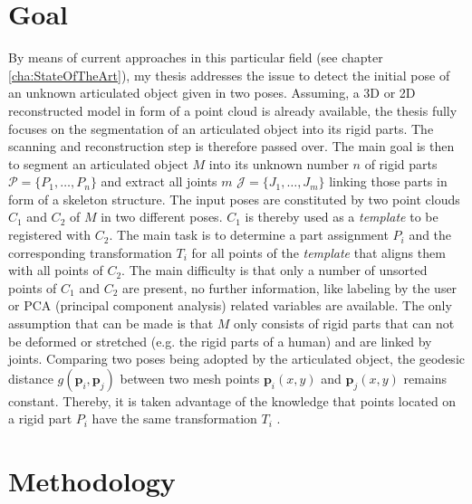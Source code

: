 \section{Goal}

By means of current approaches in this particular field (see chapter \ref{cha:StateOfTheArt}), my thesis addresses the issue to detect the initial pose of an unknown articulated object given in two poses. Assuming, a 3D or 2D reconstructed model in form of a point cloud is already available, the thesis fully focuses on the segmentation of an articulated object into its rigid parts. The scanning and reconstruction step is therefore passed over. The main goal is then to segment an articulated object $M$ into its unknown number $n$ of rigid parts $\mathcal{P} =  \{P_1,\ldots,P_n\}$ and extract all joints $m$ $\mathcal{J} =  \{J_1,\ldots,J_m\}$ linking those parts in form of a skeleton structure. The input poses are constituted by two point clouds $C_1$ and $C_2$ of $M$ in two different poses. $C_1$ is thereby used as a \textit{template} to be registered with $C_2$. The main task is to determine a part assignment $P_i$ and the corresponding transformation $T_i$ for all points of the \textit{template} that aligns them with all points of $C_2$. The main difficulty is that only a number of unsorted points of $C_1$ and $C_2$ are present, no further information, like labeling by the user or PCA (principal component analysis) related variables are available. The only assumption that can be made is that $M$ only consists of rigid parts that can not be deformed or stretched (e.g. the rigid parts of a human) and are linked by joints. Comparing two poses being adopted by the articulated object, the geodesic distance $g(\boldsymbol{p}_i,\boldsymbol{p}_j)$ between two mesh points $\boldsymbol{p}_i(x,y)$ and $\boldsymbol{p}_j(x,y)$ remains constant. Thereby, it is taken advantage of the knowledge that points located on a rigid part $P_i$ have the same transformation $T_i$ .

\section{Methodology}

